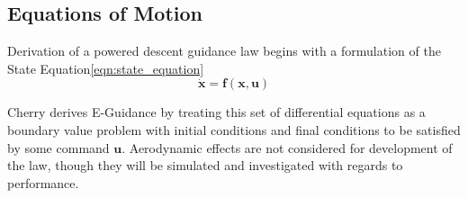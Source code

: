 %
%
%
%
%
%
%











\subsection{Equations of Motion}\label{sec:EOMS}
Derivation of a powered descent guidance law begins with a formulation of the State Equation\:\ref{eqn:state_equation}
\begin{equation}
\dot{\bm{x}} = \bm{f}(\bm{x,\bm{u}})
\label{eqn:state_equation}
\end{equation}

Cherry derives E-Guidance by treating this set of differential equations as a boundary value problem with initial conditions and final conditions to be satisfied by some command $\bm{u}$. Aerodynamic effects are not considered for development of the law, though they will be simulated and investigated with regards to performance.

